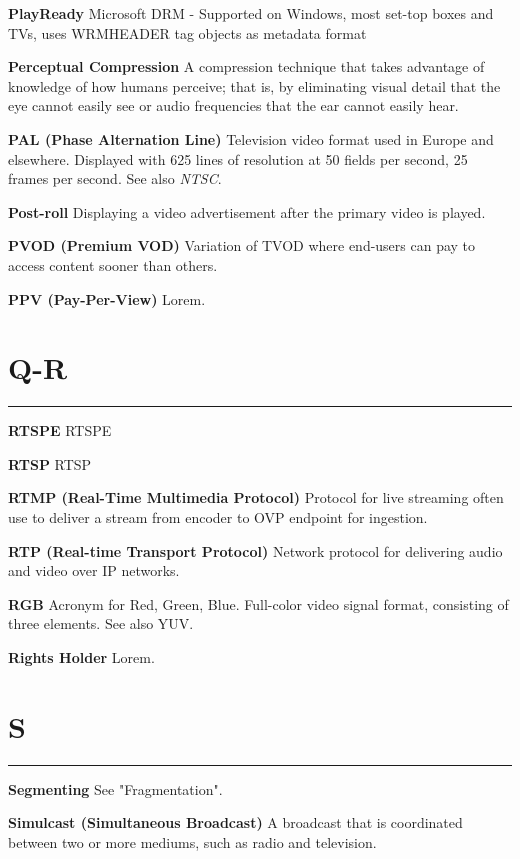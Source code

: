 \smallskip
\textbf{PlayReady}
Microsoft DRM - Supported on Windows, most set-top boxes and TVs, uses WRMHEADER tag objects as metadata format

\smallskip
\textbf{Perceptual Compression}
A compression technique that takes advantage of knowledge of how humans perceive; that is, by eliminating visual detail that the eye cannot easily see or audio frequencies that the ear cannot easily hear.

\smallskip
\textbf{PAL (Phase Alternation Line)}
Television video format used in Europe and elsewhere. Displayed with 625 lines of resolution at 50 fields per second, 25 frames per second. See also \textit{NTSC}.

\smallskip
\textbf{Post-roll}
Displaying a video advertisement after the primary video is played.

\smallskip
\textbf{PVOD (Premium VOD)}
Variation of TVOD where end-users can pay to access content sooner than others.

\smallskip
\textbf{PPV (Pay-Per-View)}
Lorem.


\section{Q-R}
\hrule

\medskip
\textbf{RTSPE}
RTSPE

\smallskip
\textbf{RTSP}
RTSP

\smallskip
\textbf{RTMP (Real-Time Multimedia Protocol)}
Protocol for live streaming often use to deliver a stream from encoder to OVP endpoint for ingestion.

\smallskip
\textbf{RTP (Real-time Transport Protocol)}
Network protocol for delivering audio and video over IP networks.

\smallskip
\textbf{RGB}
Acronym for Red, Green, Blue. Full-color video signal format, consisting of three elements. See also YUV.

\smallskip
\textbf{Rights Holder}
Lorem.

\section{S}
\hrule

\medskip
\textbf{Segmenting}
See "Fragmentation".

\smallskip
\textbf{Simulcast (Simultaneous Broadcast)}
A broadcast that is coordinated between two or more mediums, such as radio and television.

